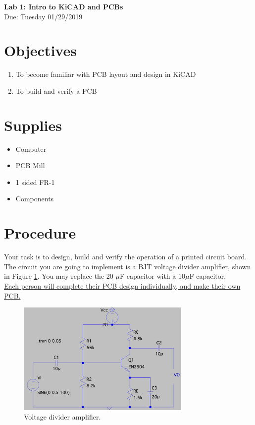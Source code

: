 \documentclass[12pt,letterpaper,onecolumn]{report}
\begin{document}
\begin{center}
\LARGE{\textbf{Lab 1: Intro to KiCAD and PCBs}}\\
\Large{Due: Tuesday 01/29/2019}
\\

\end{center}

\section*{Objectives}
\begin{enumerate}
\item To become familiar with PCB layout and design in KiCAD
\item To build and verify a PCB

\end{enumerate}

\section*{Supplies}
\begin{itemize}
\item Computer
\item PCB Mill
\item 1 sided FR-1
\item Components
\end{itemize}

\section*{Procedure}
Your task is to design, build and verify the operation of a printed circuit board.  The circuit you are going to implement is a BJT voltage divider amplifier, shown in Figure \ref{Fig1}.  You may replace the 20 $\mu$F capacitor with a 10$\mu$F capacitor.\\

\noindent\underline{Each person will complete their PCB design individually, and make their own PCB.}

\begin{figure}[ht]
\begin{center}
\includegraphics[width=0.75\textwidth]{Figures/VD_BJT_amp.png}
\caption{Voltage divider amplifier.}
\label{Fig1}
\end{center}
\end{figure}
\end{document}
